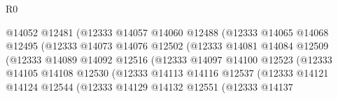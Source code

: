 \begin{lexlean}{R0}
\begin{coremodule}
                                          @14052
                                          @12481
                                          (@12333
                                            @14057
                                            @14060
                                            @12488
                                            (@12333
                                              @14065
                                              @14068
                                              @12495
                                              (@12333
                                                @14073
                                                @14076
                                                @12502
                                                (@12333
                                                  @14081
                                                  @14084
                                                  @12509
                                                  (@12333
                                                    @14089
                                                    @14092
                                                    @12516
                                                    (@12333
                                                      @14097
                                                      @14100
                                                      @12523
                                                      (@12333
                                                        @14105
                                                        @14108
                                                        @12530
                                                        (@12333
                                                          @14113
                                                          @14116
                                                          @12537
                                                          (@12333
                                                            @14121
                                                            @14124
                                                            @12544
                                                            (@12333
                                                              @14129
                                                              @14132
                                                              @12551
                                                              (@12333
                                                                @14137

\end{coremodule}
\end{lexlean}
